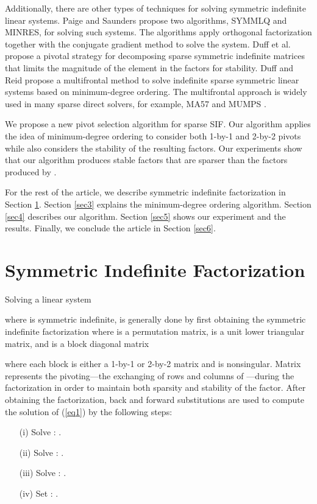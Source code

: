 \documentclass{article}
\begin{document}
Additionally, there are other types of techniques for solving symmetric indefinite linear systems.  Paige and Saunders \cite{SSIF1} propose two algorithms, SYMMLQ and MINRES, for solving such systems.  The algorithms apply orthogonal factorization together with the conjugate gradient method to solve the system.  Duff et al.\ \cite{SSIF2} propose a pivotal strategy for decomposing sparse symmetric indefinite matrices that limits the magnitude of the element in the factors for stability.
Duff and Reid \cite{MFrontal1} propose a multifrontal method to solve indefinite sparse symmetric linear systems based on minimum-degree ordering.
The multifrontal approach is widely used in many sparse direct solvers, for example, MA57 and MUMPS \cite{DS1, MA57}.

We propose a new pivot selection algorithm for sparse SIF.  Our algorithm applies the idea of minimum-degree ordering to consider both 1-by-1 and 2-by-2 pivots while also considers the stability of the resulting factors.  Our experiments show that our algorithm produces stable factors that are sparser than the factors produced by \cite{MA57}.

For the rest of the article, we describe symmetric indefinite factorization in Section \ref{sec2}.  Section \ref{sec3} explains the minimum-degree ordering algorithm.  Section \ref{sec4} describes our algorithm.  Section \ref{sec5} shows our experiment and the results.  Finally, we conclude the article in Section \ref{sec6}.





\section{Symmetric Indefinite Factorization}\label{sec2}
Solving a linear system

where  is symmetric indefinite, is generally done by first obtaining the symmetric indefinite factorization 
where  is a permutation matrix,  is a unit lower triangular matrix, and  is a block diagonal matrix

where each block  is either a 1-by-1 or 2-by-2 matrix and is nonsingular.  Matrix  represents the pivoting---the exchanging of rows and columns of ---during the factorization in order to maintain both sparsity and stability of the factor.
After obtaining the factorization, back and forward substitutions are used to compute the solution of (\ref{eq1}) by the following steps:
\begin{enumerate}
\item[(i)]\label{step1} Solve  : .
\item[(ii)]\label{step2} Solve  : .
\item[(iii)]\label{step3}Solve  : .
\item[(iv)]\label{step4}Set : .
\end{enumerate}
\end{document}
